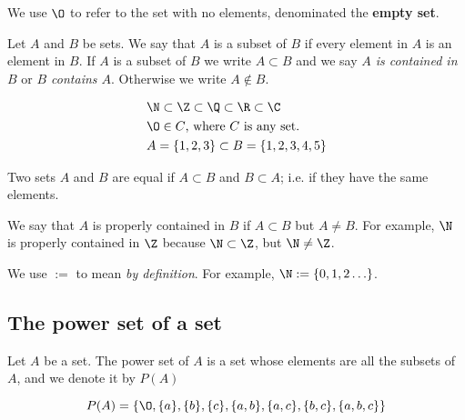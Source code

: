 We use $\O$ to refer to the set with no elements, denominated the \textbf{empty set}.

\begin{definition}
    Let $A$ and $B$ be sets. We say that $A$ is a subset of $B$ if every element in $A$ is an element in $B$. If $A$ is a subset of $B$ we write $A\subset B$ and we say \textit{$A$ is contained in $B$} or \textit{$B$ contains $A$}. Otherwise we write $A\notin B$.
\end{definition}
\begin{example}
    \begin{align}
        &\N\subset\Z\subset\Q\subset\R\subset\C \\
        &\O\in C\textrm{, where $C$ is any set.} \\
        &A = \{1, 2, 3\} \subset B = \{1, 2, 3, 4, 5\} 
    \end{align}
\end{example}

\begin{definition}
    Two sets $A$ and $B$ are equal if $A \subset B$ and $B\subset A$; i.e. if they have the same elements.
\end{definition}
\begin{definition}
    We say that $A$ is properly contained in $B$ if $A\subset B$ but $A\neq B$. For example, $\N$ is properly contained in $\Z$ because $\N\subset\Z$, but $\N\neq\Z$.
\end{definition}
\begin{note}
    We use $:=$ to mean \textit{by definition}. For example, $\N := \{0, 1, 2\ldots\} $.
\end{note}

\subsection{The power set of a set}
\begin{definition}
    Let $A$ be a set. The power set of $A$ is a set whose elements are all the subsets of $A$, and we denote it by $P\left( A \right) $
\end{definition}
\begin{example}[Power set of $A = \{a, b, c\} $.]
    \begin{equation}
    P(A) = \lbrace \O, \{a\}, \{b\}, \{c\}, \{a, b\}, \{a, c\}, \{b, c\}, \{a, b, c\}\rbrace
    \end{equation}
\end{example}

